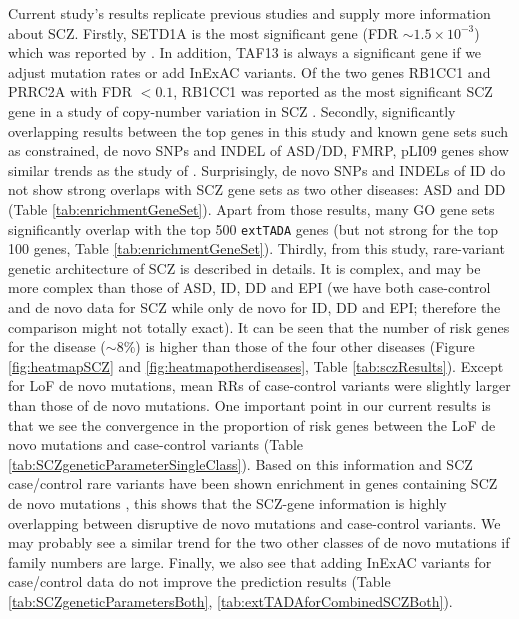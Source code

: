 \documentclass[]{article}
\begin{document}
Current study's results replicate previous studies and supply more
information about SCZ. Firstly, SETD1A is the most significant gene
(FDR $\sim 1.5 \times 10^{-3}$) which was reported by \cite{singh2016rare,
  takata2016novo}. In addition, TAF13 is always a significant gene if we
adjust mutation rates or add InExAC variants. Of the two genes RB1CC1
and PRRC2A with FDR $<0.1$, RB1CC1 was reported as the most significant SCZ gene in a
study of copy-number variation in SCZ
\citep{degenhardt2013duplications}. Secondly, significantly
overlapping results between the top genes in this study and known gene
sets such as constrained, de novo SNPs and INDEL of ASD/DD, FMRP, pLI09 genes
show similar trends as the study of
\cite{genovese2016increased}. Surprisingly, de novo SNPs and INDELs of
ID do not show strong overlaps with SCZ gene sets as two other
diseases: ASD and DD (Table \ref{tab:enrichmentGeneSet}). Apart
from those results, many GO gene sets significantly overlap with the top
500 \texttt{extTADA} genes (but not strong for the top 100 genes, Table
\ref{tab:enrichmentGeneSet}). Thirdly, from this study, rare-variant
genetic architecture of SCZ is described in details. It is complex,
and may be more complex than those of ASD, ID, DD and EPI (we
have both case-control and de novo data for SCZ while only de novo for
ID, DD and EPI; therefore the comparison might not totally exact). It can be seen
that the number of risk genes
for the disease ($\sim 8\%$) is higher than those of the four other diseases  (Figure \ref{fig:heatmapSCZ} and
\ref{fig:heatmapotherdiseases}, Table \ref{tab:sczResults}). Except
for LoF de novo mutations, mean RRs of case-control variants were
slightly larger than those of de novo mutations. One important point
in our current results is that we see the convergence in the
proportion of risk genes between the LoF de novo mutations and
case-control variants (Table \ref{tab:SCZgeneticParameterSingleClass}). Based on this information and SCZ case/control rare variants have been shown enrichment in genes containing SCZ de novo mutations \citep{genovese2016increased,purcell2014polygenic}, this shows that the SCZ-gene information
is highly overlapping between disruptive de novo mutations and case-control variants. We may probably see a similar trend for the two other classes of de novo mutations if family numbers are large. Finally, we
also see that adding InExAC variants for case/control data do not
improve the prediction results (Table
\ref{tab:SCZgeneticParametersBoth}, \ref{tab:extTADAforCombinedSCZBoth}).
\end{document}
